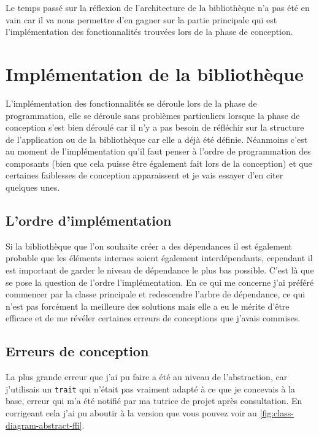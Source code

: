 \documentclass[11pt,a4paper,krantz2,11pt,oneside]{krantz}
\begin{document}
Le temps passé sur la réflexion de l'architecture de la bibliothèque n'a pas été en vain car il va nous permettre d'en gagner sur la partie principale qui est l'implémentation des fonctionnalités trouvées lors de la phase de conception.

\hypertarget{impluxe9mentation-de-la-bibliothuxe8que}{%
\section{Implémentation de la bibliothèque}\label{impluxe9mentation-de-la-bibliothuxe8que}}

L'implémentation des fonctionnalités se déroule lors de la phase de programmation, elle se déroule sans problèmes particuliers lorsque la phase de conception s'est bien déroulé car il n'y a pas besoin de réfléchir sur la structure de l'application ou de la bibliothèque car elle a déjà été définie. Néanmoins c'est au moment de l'implémentation qu'il faut penser à l'ordre de programmation des composants (bien que cela puisse être également fait lors de la conception) et que certaines faiblesses de conception apparaissent et je vais essayer d'en citer quelques unes.

\hypertarget{lordre-dimpluxe9mentation}{%
\subsection{L'ordre d'implémentation}\label{lordre-dimpluxe9mentation}}

Si la bibliothèque que l'on souhaite créer a des dépendances il est également probable que les éléments internes soient également interdépendants, cependant il est important de garder le niveau de dépendance le plus bas possible. C'est là que se pose la question de l'ordre l'implémentation. En ce qui me concerne j'ai préféré commencer par la classe principale et redescendre l'arbre de dépendance, ce qui n'est pas forcément la meilleure des solutions mais elle a eu le mérite d'être efficace et de me révéler certaines erreurs de conceptions que j'avais commises.

\hypertarget{erreurs-de-conception}{%
\subsection{Erreurs de conception}\label{erreurs-de-conception}}

La plus grande erreur que j'ai pu faire a été au niveau de l'abstraction, car j'utilisais un \texttt{trait} qui n'était pas vraiment adapté à ce que je concevais à la base, erreur qui m'a été notifié par ma tutrice de projet après consultation. En corrigeant cela j'ai pu aboutir à la version que vous pouvez voir au \ref{fig:class-diagram-abstract-ffi}.
\end{document}
